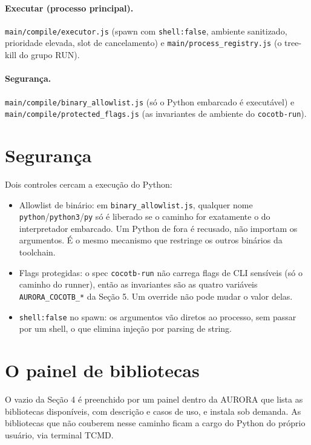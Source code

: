 \documentclass[11pt,a4paper]{article}
\begin{document}
\paragraph{Executar (processo principal).}
\texttt{main/compile/executor.js} (spawn com \texttt{shell:false}, ambiente
sanitizado, prioridade elevada, slot de cancelamento) e
\texttt{main/process\_registry.js} (o tree-kill do grupo RUN).

\paragraph{Segurança.}
\texttt{main/compile/binary\_allowlist.js} (só o Python embarcado é executável) e
\texttt{main/compile/protected\_flags.js} (as invariantes de ambiente do
\texttt{cocotb-run}).

\section{Segurança}

Dois controles cercam a execução do Python:

\begin{itemize}
  \item Allowlist de binário: em \texttt{binary\_allowlist.js}, qualquer nome
        \texttt{python}/\texttt{python3}/\texttt{py} só é liberado se o caminho
        for exatamente o do interpretador embarcado. Um Python de fora é
        recusado, não importam os argumentos. É o mesmo mecanismo que restringe
        os outros binários da toolchain.
  \item Flags protegidas: o spec \texttt{cocotb-run} não carrega flags de CLI
        sensíveis (só o caminho do runner), então as invariantes são as quatro
        variáveis \texttt{AURORA\_COCOTB\_*} da Seção 5. Um override não pode
        mudar o valor delas.
  \item \texttt{shell:false} no spawn: os argumentos vão diretos ao processo, sem
        passar por um shell, o que elimina injeção por parsing de string.
\end{itemize}

\section{O painel de bibliotecas}

O vazio da Seção 4 é preenchido por um painel dentro da AURORA que lista as
bibliotecas disponíveis, com descrição e casos de uso, e instala sob demanda. As
bibliotecas que não couberem nesse caminho ficam a cargo do Python do próprio
usuário, via terminal TCMD.
\end{document}
